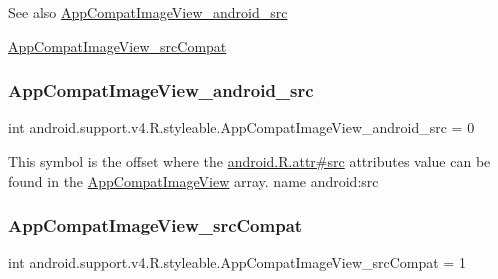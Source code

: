 \begin{DoxySeeAlso}{See also}
\hyperlink{classandroid_1_1support_1_1v4_1_1R_1_1styleable_a2eb2724fb5893dd2a8a334066b964f2d}{App\+Compat\+Image\+View\+\_\+android\+\_\+src} 

\hyperlink{classandroid_1_1support_1_1v4_1_1R_1_1styleable_ae18967a7ec03c0b47f1a1f8a1eb6c4fa}{App\+Compat\+Image\+View\+\_\+src\+Compat} 
\end{DoxySeeAlso}
\mbox{\label{classandroid_1_1support_1_1v4_1_1R_1_1styleable_a2eb2724fb5893dd2a8a334066b964f2d}} 
\subsubsection{\texorpdfstring{App\+Compat\+Image\+View\+\_\+android\+\_\+src}{AppCompatImageView\_android\_src}}
{\footnotesize\ttfamily int android.\+support.\+v4.\+R.\+styleable.\+App\+Compat\+Image\+View\+\_\+android\+\_\+src = 0\hspace{0.3cm}{\ttfamily [static]}}

This symbol is the offset where the \hyperlink{}{android.\+R.\+attr\#src} attribute\textquotesingle{}s value can be found in the \hyperlink{classandroid_1_1support_1_1v4_1_1R_1_1styleable_a4d9bb42e7947f32882ba5a45bc43a0a1}{App\+Compat\+Image\+View} array.  name android\+:src \mbox{\label{classandroid_1_1support_1_1v4_1_1R_1_1styleable_ae18967a7ec03c0b47f1a1f8a1eb6c4fa}} 
\subsubsection{\texorpdfstring{App\+Compat\+Image\+View\+\_\+src\+Compat}{AppCompatImageView\_srcCompat}}
{\footnotesize\ttfamily int android.\+support.\+v4.\+R.\+styleable.\+App\+Compat\+Image\+View\+\_\+src\+Compat = 1\hspace{0.3cm}{\ttfamily [static]}}

